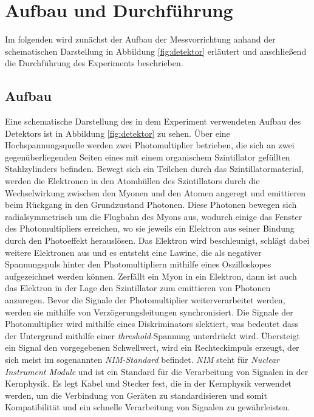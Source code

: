 \section{Aufbau und Durchführung}\label{sec:AufbauDurchfuehrung}

Im folgenden wird zunächst der Aufbau der Messvorrichtung anhand der schematischen Darstellung in Abbildung \ref{fig:detektor} erläutert und anschließend die Durchführung des Experiments beschrieben.

\subsection{Aufbau}\label{subsec:Aufbau}
Eine schematische Darstellung des in dem Experiment verwendeten Aufbau des Detektors ist in Abbildung \ref{fig:detektor} zu sehen.
Über eine Hochspannungsquelle werden zwei Photomultiplier betrieben, die sich an zwei gegenüberliegenden Seiten eines mit einem organischem Szintillator gefüllten Stahlzylinders befinden.
Bewegt sich ein Teilchen durch das Szintillatormaterial, werden die Elektronen in den Atomhüllen des Szintillators durch die Wechselwirkung zwischen den Myonen und den Atomen angeregt und emittieren beim Rückgang in den Grundzustand Photonen.
Diese Photonen bewegen sich radialsymmetrisch um die Flugbahn des Myons aus, wodurch einige das Fenster des Photomultipliers erreichen, wo sie jeweils ein Elektron aus seiner Bindung durch den Photoeffekt herauslösen.
Das Elektron wird beschleunigt, schlägt dabei weitere Elektronen aus und es entsteht eine Lawine, die als negativer Spannungspuls hinter den Photomultipliern mithilfe eines Oszilloskopes aufgezeichnet werden können.
Zerfällt ein Myon in ein Elektron, dann ist auch das Elektron in der Lage den Szintillator zum emittieren von Photonen anzuregen. \newline
Bevor die Signale der Photomultiplier weiterverarbeitet werden, werden sie mithilfe von Verzögerungsleitungen synchronisiert.
Die Signale der Photomultiplier wird mithilfe eines Diskriminators slektiert, was bedeutet dass der Untergrund mithilfe einer \textit{threshold}-Spannung unterdrückt wird.
Übersteigt ein Signal den vorgegebenen Schwellwert, wird ein Rechteckimpuls erzeugt, der sich meist im sogenannten \textit{NIM-Standard} befindet. %
\textit{NIM} steht für \textit{Nuclear Instrument Module} und ist ein Standard für die Verarbeitung von Signalen in der Kernphysik.
Es legt Kabel und Stecker fest, die in der Kernphysik verwendet werden, um die Verbindung von Geräten zu standardisieren und somit Kompatibilität und ein schnelle Verarbeitung von Signalen zu gewährleisten.
